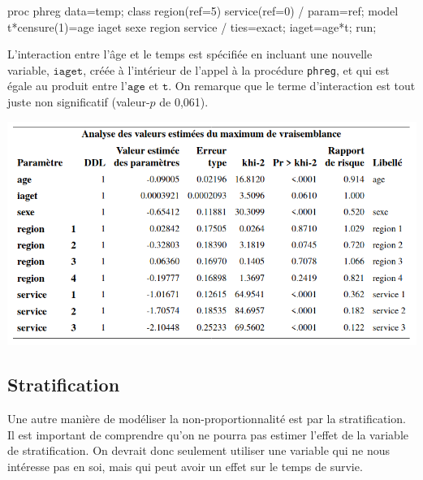 \documentclass[
  11pt,
  letterpaper,
]{book}
\newenvironment{Shaded}{\begin{snugshade}}{\end{snugshade}}
\newcommand{\NormalTok}[1]{#1}
\theoremstyle{definition}
\theoremstyle{definition}
\theoremstyle{definition}
\theoremstyle{definition}
\theoremstyle{remark}
\begin{document}
\begin{Shaded}
\begin{Highlighting}[]
\NormalTok{proc phreg data=temp;}
\NormalTok{class region(ref=\textquotesingle{}5\textquotesingle{}) service(ref=\textquotesingle{}0\textquotesingle{}) / param=ref;}
\NormalTok{model t*censure(1)=age iaget sexe region service / ties=exact;}
\NormalTok{iaget=age*t; }
\NormalTok{run;}
\end{Highlighting}
\end{Shaded}

L'interaction entre l'âge et le temps est spécifiée en incluant une nouvelle variable, \(\texttt{iaget}\), créée à l'intérieur de l'appel à la procédure \texttt{phreg}, et qui est égale au produit entre l'\(\texttt{age}\) et \(\texttt{t}\). On remarque que le terme d'interaction est tout juste non significatif (valeur-\(p\) de 0,061).

\begin{center}\includegraphics[width=0.85\linewidth]{figures/05-survie-e30} \end{center}

\hypertarget{stratification}{%
\subsection{Stratification}\label{stratification}}

Une autre manière de modéliser la non-proportionnalité est par la stratification. Il est important de comprendre qu'on ne pourra pas estimer l'effet de la variable de stratification. On devrait donc seulement utiliser une variable qui ne nous intéresse pas en soi, mais qui peut avoir un effet sur le temps de survie.
\end{document}
